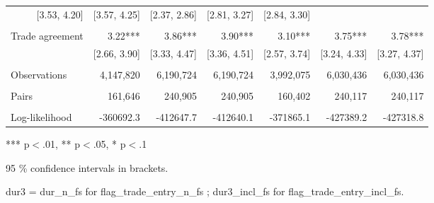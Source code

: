 \begin{table}[!h]
\begin{tabular}{lllllll}
  \multicolumn{1}{r}{[3.53,    4.20]} &
  \multicolumn{1}{r}{[3.57,    4.25]} &
  \multicolumn{1}{r}{[2.37,    2.86]} &
  \multicolumn{1}{r}{[2.81,    3.27]} &
  \multicolumn{1}{r}{[2.84,    3.30]} \\
\multicolumn{1}{l}{} &
  \multicolumn{1}{|r}{} &
  \multicolumn{1}{r}{} &
  \multicolumn{1}{r}{} &
  \multicolumn{1}{r}{} &
  \multicolumn{1}{r}{} &
  \multicolumn{1}{r}{} \\
\multicolumn{1}{l}{Trade agreement} &
  \multicolumn{1}{|r}{3.22***} &
  \multicolumn{1}{r}{3.86***} &
  \multicolumn{1}{r}{3.90***} &
  \multicolumn{1}{r}{3.10***} &
  \multicolumn{1}{r}{3.75***} &
  \multicolumn{1}{r}{3.78***} \\
\multicolumn{1}{l}{} &
  \multicolumn{1}{|r}{[2.66,    3.90]} &
  \multicolumn{1}{r}{[3.33,    4.47]} &
  \multicolumn{1}{r}{[3.36,    4.51]} &
  \multicolumn{1}{r}{[2.57,    3.74]} &
  \multicolumn{1}{r}{[3.24,    4.33]} &
  \multicolumn{1}{r}{[3.27,    4.37]} \\
\multicolumn{1}{l}{} &
  \multicolumn{1}{|r}{} &
  \multicolumn{1}{r}{} &
  \multicolumn{1}{r}{} &
  \multicolumn{1}{r}{} &
  \multicolumn{1}{r}{} &
  \multicolumn{1}{r}{} \\
\multicolumn{1}{l}{Observations} &
  \multicolumn{1}{|r}{4,147,820} &
  \multicolumn{1}{r}{6,190,724} &
  \multicolumn{1}{r}{6,190,724} &
  \multicolumn{1}{r}{3,992,075} &
  \multicolumn{1}{r}{6,030,436} &
  \multicolumn{1}{r}{6,030,436} \\
\multicolumn{1}{l}{} &
  \multicolumn{1}{|r}{} &
  \multicolumn{1}{r}{} &
  \multicolumn{1}{r}{} &
  \multicolumn{1}{r}{} &
  \multicolumn{1}{r}{} &
  \multicolumn{1}{r}{} \\
\multicolumn{1}{l}{Pairs} &
  \multicolumn{1}{|r}{161,646} &
  \multicolumn{1}{r}{240,905} &
  \multicolumn{1}{r}{240,905} &
  \multicolumn{1}{r}{160,402} &
  \multicolumn{1}{r}{240,117} &
  \multicolumn{1}{r}{240,117} \\
\multicolumn{1}{l}{} &
  \multicolumn{1}{|r}{} &
  \multicolumn{1}{r}{} &
  \multicolumn{1}{r}{} &
  \multicolumn{1}{r}{} &
  \multicolumn{1}{r}{} &
  \multicolumn{1}{r}{} \\
\multicolumn{1}{l}{Log-likelihood} &
  \multicolumn{1}{|r}{-360692.3} &
  \multicolumn{1}{r}{-412647.7} &
  \multicolumn{1}{r}{-412640.1} &
  \multicolumn{1}{r}{-371865.1} &
  \multicolumn{1}{r}{-427389.2} &
  \multicolumn{1}{r}{-427318.8} \\
\cline{1-7}
\end{tabular}

\footnotesize{
*** p$<$.01, ** p$<$.05, * p$<$.1

95 \% confidence intervals in brackets.

dur3 = dur\_n\_fs for flag\_trade\_entry\_n\_fs ; dur3\_incl\_fs for flag\_trade\_entry\_incl\_fs.
}
\end{table}
